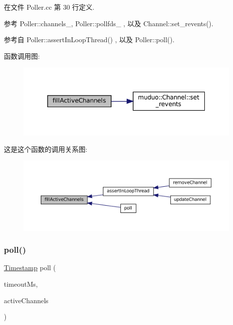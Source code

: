 在文件 Poller.\+cc 第 30 行定义.



参考 Poller\+::channels\+\_\+, Poller\+::pollfds\+\_\+ , 以及 Channel\+::set\+\_\+revents().



参考自 Poller\+::assert\+In\+Loop\+Thread() , 以及 Poller\+::poll().

函数调用图\+:
\nopagebreak
\begin{figure}[H]
\begin{center}
\leavevmode
\includegraphics[width=337pt]{classmuduo_1_1Poller_a93b3d6d6cac94e92c2ddfd91e9b18cc0_cgraph}
\end{center}
\end{figure}
这是这个函数的调用关系图\+:
\nopagebreak
\begin{figure}[H]
\begin{center}
\leavevmode
\includegraphics[width=350pt]{classmuduo_1_1Poller_a93b3d6d6cac94e92c2ddfd91e9b18cc0_icgraph}
\end{center}
\end{figure}
\mbox{\label{classmuduo_1_1Poller_a0165aabf2721e39f87ad67b05ece9267}} 
\subsubsection{\texorpdfstring{poll()}{poll()}}
{\footnotesize\ttfamily \hyperlink{classmuduo_1_1Timestamp}{Timestamp} poll (\begin{DoxyParamCaption}\item[{int}]{timeout\+Ms,  }\item[{\hyperlink{classmuduo_1_1Poller_a0b74248ffee6df294563618187b52404}{Channel\+List} $\ast$}]{active\+Channels }\end{DoxyParamCaption})}



